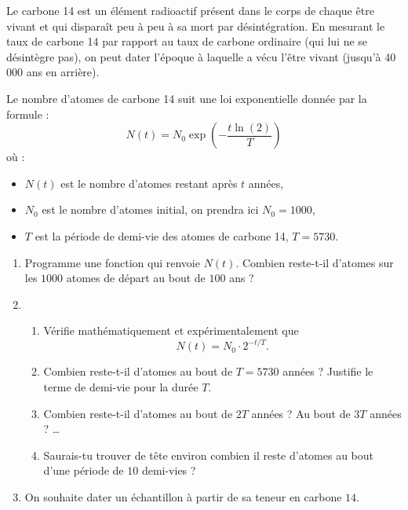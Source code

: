 \documentclass[11pt,class=report,crop=false]{standalone}
\begin{document}
\begin{activite}

Le carbone 14 est un élément radioactif présent dans le corps de chaque être vivant et qui disparaît peu à peu à sa mort par désintégration. En mesurant le taux de carbone 14 par rapport au taux de carbone ordinaire (qui lui ne se désintègre pas), on peut dater l'époque à laquelle a vécu l'être vivant (jusqu'à 40\,000 ans en arrière).

Le nombre d'atomes de carbone 14 suit une loi exponentielle donnée par la formule :
$$N(t) = N_0 \exp\left(-\frac{t \ln(2)}{T}\right)$$
où :
\begin{itemize}
  \item $N(t)$ est le nombre d'atomes restant après $t$ années,
  \item $N_0$ est le nombre d'atomes initial, on prendra ici $N_0 = 1000$,
  \item $T$ est la période de demi-vie des atomes de carbone 14, $T = 5730$.
\end{itemize}



  \begin{enumerate}
    \item Programme une fonction  qui renvoie
    $N(t)$. Combien reste-t-il d'atomes sur les $1000$ atomes de départ au bout de $100$ ans ?
    
    \item 
    \begin{enumerate}
      \item Vérifie mathématiquement et expérimentalement que 
    $$N(t) = N_0 \cdot 2^{-t/T}.$$
    
      \item Combien reste-t-il d'atomes au bout de $T=5730$ années ? Justifie le terme de \og{}demi-vie\fg{} pour la durée $T$.
    
      \item Combien reste-t-il d'atomes au bout de $2T$ années ? Au bout de $3T$ années ? \ldots
    
      \item Saurais-tu trouver de tête environ combien il reste d'atomes au bout d'une période de  $10$ demi-vies ?
    \end{enumerate}
    
    \item On souhaite dater un échantillon à partir de sa teneur en carbone $14$.  
    

\end{enumerate}
\end{activite}
\end{document}

